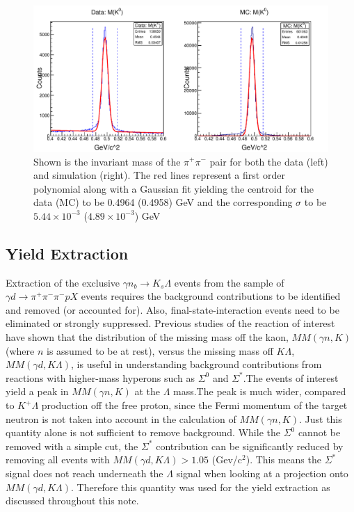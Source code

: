\documentclass[prb,10pt,twocolumn,tightenlines,superscriptaddress]{revtex4-1}
\begin{document}
\begin{figure}[h]
    \centering
      \includegraphics[width=\linewidth]{kaon}
    \caption{Shown is the invariant mass of the $\pi^{+}\pi^{-}$ pair for both the data (left) and simulation (right). The red lines represent a first order polynomial along with a Gaussian fit yielding the centroid for the data (MC) to be 0.4964 (0.4958) GeV and the corresponding $\sigma$ to be $5.44\times 10^{-3}$ ($4.89 \times 10^{-3}$) GeV}
        \label{fig:kaonfit}%
\end{figure}

\subsection{Yield Extraction}
Extraction of the exclusive $\gamma n_{b} \rightarrow K_{s}\Lambda$ events from the sample of $\gamma d \rightarrow \pi^{+}\pi^{-}\pi^{-}pX$ events requires the background contributions to be identified and removed (or accounted for). Also, final-state-interaction events need to be eliminated or strongly suppressed. Previous studies of the reaction of interest\cite{bib:ref6} have shown that the distribution of the missing mass off the kaon, $MM(\gamma n,K)$ (where $n$ is assumed to be at rest), versus the missing mass off $K\Lambda$, $MM(\gamma d,K\Lambda)$, is useful in understanding background contributions from reactions with higher-mass hyperons such as $\Sigma^{0}$ and $\Sigma^{*}$.The events of interest yield a peak in $MM(\gamma n,K)$ at the $\Lambda$ mass.The peak is much wider, compared to $K^{+}\Lambda$ production off the free proton, since the Fermi momentum of the target neutron is not taken into account in the calculation of $MM(\gamma n,K)$. Just this quantity alone is not sufficient to remove background. While the $\Sigma^{0}$ cannot be removed with a simple cut, the $\Sigma^{*}$ contribution can be significantly reduced by removing all events with $MM(\gamma d,K\Lambda) > 1.05$ (Gev/c$^{2}$). This means the $\Sigma^{*}$ signal does not reach underneath the $\Lambda$ signal when looking at a projection onto $MM(\gamma d,K\Lambda)$.
Therefore this quantity was used for the yield extraction as discussed throughout this note.
\end{document}
